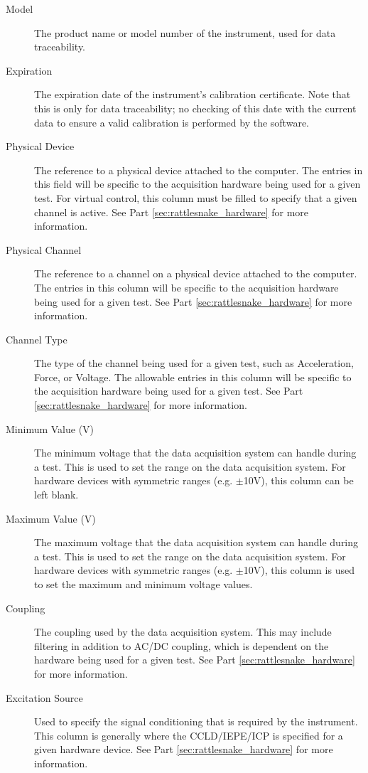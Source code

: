 \documentclass[pdf,12pt,report]{SANDreport}
\begin{document}
\begin{description}
        \item[Model] The product name or model number of the instrument, used for data traceability.
        \item[Expiration] The expiration date of the instrument's calibration certificate.  Note that this is only for data traceability; no checking of this date with the current data to ensure a valid calibration is performed by the software.
        \item[Physical Device] The reference to a physical device attached to the computer.  The entries in this field will be specific to the acquisition hardware being used for a given test.  For virtual control, this column must be filled to specify that a given channel is active.  See Part \ref{sec:rattlesnake_hardware} for more information.
        \item[Physical Channel] The reference to a channel on a physical device attached to the computer.  The entries in this column will be specific to the acquisition hardware being used for a given test.  See Part \ref{sec:rattlesnake_hardware} for more information.
        \item[Channel Type] The type of the channel being used for a given test, such as Acceleration, Force, or Voltage.  The allowable entries in this column will be specific to the acquisition hardware being used for a given test.  See Part \ref{sec:rattlesnake_hardware} for more information.
        \item[Minimum Value (V)] The minimum voltage that the data acquisition system can handle during a test.  This is used to set the range on the data acquisition system.  For hardware devices with symmetric ranges (e.g. $\pm$10V), this column can be left blank.
        \item[Maximum Value (V)]  The maximum voltage that the data acquisition system can handle during a test.  This is used to set the range on the data acquisition system.  For hardware devices with symmetric ranges (e.g. $\pm$10V), this column is used to set the maximum and minimum voltage values.
        \item[Coupling] The coupling used by the data acquisition system.  This may include filtering in addition to AC/DC coupling, which is dependent on the hardware being used for a given test.  See Part \ref{sec:rattlesnake_hardware} for more information.
        \item[Excitation Source] Used to specify the signal conditioning that is required by the instrument.  This column is generally where the \ac{CCLD}/\ac{IEPE}/\ac{ICP} is specified for a given hardware device.  See Part \ref{sec:rattlesnake_hardware} for more information.

\end{description}
\end{document}
